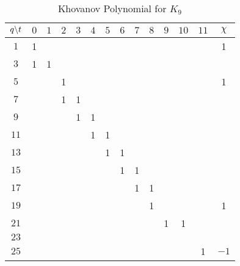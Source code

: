 \documentclass{article}
\theoremstyle{plain}
\begin{document}
        \begin{table}[H]
            \centering
            \begin{tabular}{| c | c | c | c | c | c | c | c | c | c | c | c | c | c |}
                \hline
                $q\symbol{92}t$&$0$&$1$&$2$&$3$&$4$&$5$&$6$&$7$&$8$&$9$&$10$&$11$&$\chi$\\
                \hline
                $1$&1&&&&&&&&&&&&1\\
                \hline
                $3$&1&1&&&&&&&&&&&\\
                \hline
                $5$&&&1&&&&&&&&&&1\\
                \hline
                $7$&&&1&1&&&&&&&&&\\
                \hline
                $9$&&&&1&1&&&&&&&&\\
                \hline
                $11$&&&&&1&1&&&&&&&\\
                \hline
                $13$&&&&&&1&1&&&&&&\\
                \hline
                $15$&&&&&&&1&1&&&&&\\
                \hline
                $17$&&&&&&&&1&1&&&&\\
                \hline
                $19$&&&&&&&&&1&&&&1\\
                \hline
                $21$&&&&&&&&&&1&1&&\\
                \hline
                $23$&&&&&&&&&&&&&\\
                \hline
                $25$&&&&&&&&&&&&1&$-1$\\
                \hline
            \end{tabular}
            \caption{Khovanov Polynomial for $K_{9}$}
            \label{table:m_9_kho}
        \end{table}
\end{document}
